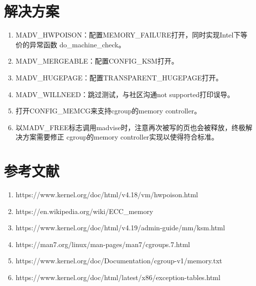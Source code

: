 \documentclass[scheme=plain]{ctexart}
\begin{document}
\section{解决方案}
\label{sec:jjfa}
\begin{enumerate}
\item MADV\_HWPOISON：配置MEMORY\_FAILURE打开，同时实现Intel下等价的异常函数
  do\_machine\_check。
\item MADV\_MERGEABLE：配置CONFIG\_KSM打开。
\item MADV\_HUGEPAGE：配置TRANSPARENT\_HUGEPAGE打开。
\item MADV\_WILLNEED：跳过测试，与社区沟通not supported打印误导。
\item 打开CONFIG\_MEMCG来支持cgroup的memory controller。
\item 以MADV\_FREE标志调用madvise时，注意再次被写的页也会被释放，终极解决方案需要修正
  cgroup的memory controller实现以使得符合标准。
\end{enumerate}

\section{参考文献}
\label{sec:ckwx}
\begin{enumerate}
\item https://www.kernel.org/doc/html/v4.18/vm/hwpoison.html
\item https://en.wikipedia.org/wiki/ECC\_memory
\item https://www.kernel.org/doc/html/v4.19/admin-guide/mm/ksm.html
\item https://man7.org/linux/man-pages/man7/cgroups.7.html
\item https://www.kernel.org/doc/Documentation/cgroup-v1/memory.txt
\item https://www.kernel.org/doc/html/latest/x86/exception-tables.html
\end{enumerate}
\end{document}
